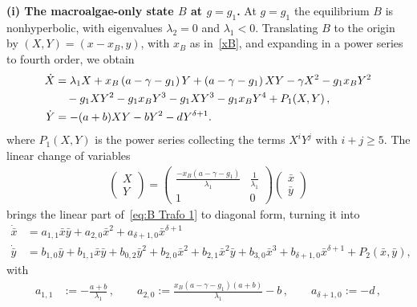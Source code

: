 \documentclass[reqno,11pt]{amsart}
\numberwithin{equation}{section}
\begin{document}
\begin{appendix}
\noindent\textbf{\textup{(i)} The macroalgae-only state $B$ at $g=g_1$.}\quad
At $g=g_1$ the equilibrium $B$ is nonhyperbolic, with eigenvalues $\lambda_2=0$ and $\lambda_1<0$.
Translating $B$ to the origin by $(X,Y)=(x-x_B,y)$, with $x_B$ as in~\eqref{xB}, and expanding in a power series to fourth order, we obtain
\begin{subequations}\label{eq:B Trafo 1}
\begin{align}
\dot X &= \lambda_1X+x_B\left(a-\gamma - g_1\right)Y+\left(a-\gamma - g_1\right)XY-\gamma X^2- g_1x_BY^2\\&\quad - g_1 XY^2- g_1x_BY^3-g_1XY^3- g_1x_BY^4+P_1(X,Y)\,, \notag\\
\dot Y &= -(a+b) XY-bY^2 -dY^{\delta +1}.
\end{align}
\end{subequations}
where $P_1(X,Y)$ is the power series collecting the terms $X^iY^j$ with $i+j\geq5$. The linear change of variables 
\begin{align*}
\begin{pmatrix}
X\\
Y
\end{pmatrix}=
\begin{pmatrix}
\frac{-x_B(a-\gamma-g_1)}{\lambda_1}& \frac{1}{\lambda_1}\\
1 & 0
\end{pmatrix}
\begin{pmatrix}
\bar{x}\\
\bar{y}
\end{pmatrix}
\end{align*}
brings the linear part of~\eqref{eq:B Trafo 1} to diagonal form, turning it into
\begin{equation*}
\begin{split}
\dot{\bar{x}} &=  a_{1,1}  \bar{x}\bar{y}+  
a_{2,0} \bar{x}^2+a_{\delta+1,0}\bar{x}^{\delta+1}
\\
\dot{\bar{y}} &= b_{1,0}\bar{y}+b_{1,1} \bar{x}\bar{y}+b_{0,2}\bar{y}^2+b_{2,0}\bar{x}^2+b_{2,1} \bar{x}^2\bar{y}+b_{3,0}\bar{x}^3+b_{\delta+1,0}\bar{x}^{\delta+1}+P_2(\bar{x},\bar{y}),
\end{split}
\end{equation*}
with
\begin{equation*}
\begin{split}
a_{1,1}&:= -\frac{a+b}{\lambda_1}\,,\qquad a_{2,0}:= \frac{x_B(a-\gamma-g_1)(a+b)}{\lambda_1}-b\,,\qquad a_{\delta+1,0}:= -d\,, \\

\end{split}
\end{equation*}
\end{appendix}
\end{document}
